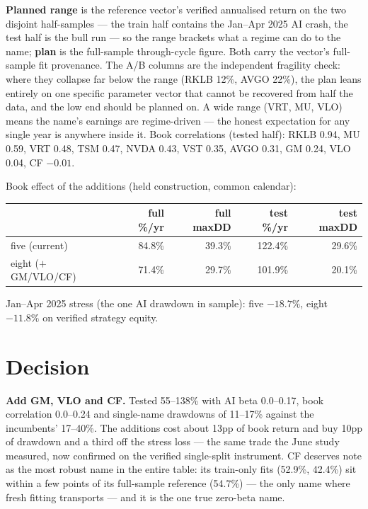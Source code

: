 \documentclass[11pt,a4paper]{article}
\begin{document}
\textbf{Planned range} is the reference vector's verified annualised return on the two
disjoint half-samples --- the train half contains the Jan--Apr 2025 AI crash, the test
half is the bull run --- so the range brackets what a regime can do to the name;
\textbf{plan} is the full-sample through-cycle figure. Both carry the vector's
full-sample fit provenance. The A/B columns are the independent fragility check: where
they collapse far below the range (RKLB 12\%, AVGO 22\%), the plan leans entirely on
one specific parameter vector that cannot be recovered from half the data, and the low
end should be planned on. A wide range (VRT, MU, VLO) means the name's earnings are
regime-driven --- the honest expectation for any single year is anywhere inside it.
Book correlations (tested half): RKLB 0.94, MU 0.59, VRT 0.48, TSM 0.47, NVDA 0.43,
VST 0.35, AVGO 0.31, GM 0.24, VLO 0.04, CF $-0.01$.

Book effect of the additions (held construction, common calendar):

\begin{center}
\begin{tabular}{lrrrr}
\toprule
 & full \%/yr & full maxDD & test \%/yr & test maxDD \\
\midrule
five (current)        & 84.8\% & 39.3\% & 122.4\% & 29.6\% \\
eight ($+$GM/VLO/CF)  & 71.4\% & 29.7\% & 101.9\% & 20.1\% \\
\bottomrule
\end{tabular}
\end{center}

Jan--Apr 2025 stress (the one AI drawdown in sample): five $-18.7\%$, eight
$-11.8\%$ on verified strategy equity.

\section*{Decision}

\textbf{Add GM, VLO and CF.} Tested 55--138\% with AI beta 0.0--0.17, book
correlation 0.0--0.24 and single-name drawdowns of 11--17\% against the incumbents'
17--40\%. The additions cost about 13pp of book return and buy 10pp of drawdown and
a third off the stress loss --- the same trade the June study measured, now confirmed
on the verified single-split instrument. CF deserves note as the most robust name in
the entire table: its train-only fits (52.9\%, 42.4\%) sit within a few points of its
full-sample reference (54.7\%) --- the only name where fresh fitting transports ---
and it is the one true zero-beta name.
\end{document}
